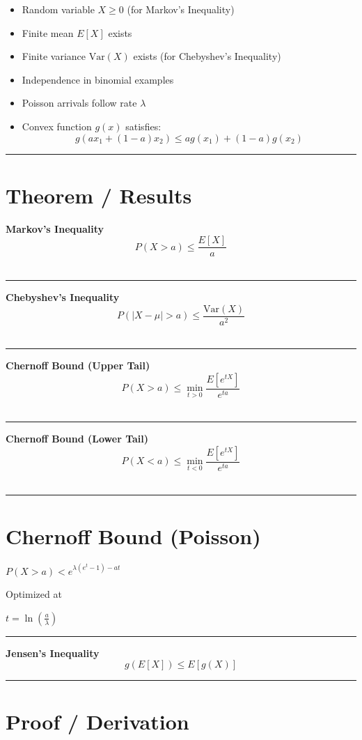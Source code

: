\documentclass[12pt]{article}
\begin{document}
\begin{itemize}
    \item Random variable $X \geq 0$ (for Markov’s Inequality)
    \item Finite mean $E[X]$ exists
    \item Finite variance $\mathrm{Var}(X)$ exists (for Chebyshev’s Inequality)
    \item Independence in binomial examples
    \item Poisson arrivals follow rate $\lambda$
    \item Convex function $g(x)$ satisfies:
    \[
    g(ax_1 + (1-a)x_2) \leq a g(x_1) + (1-a) g(x_2)
    \]
\end{itemize}
\noindent\rule{\textwidth}{0.4pt}
\section*{Theorem / Results}

\textbf{Markov’s Inequality}
\[
P(X > a) \leq \frac{E[X]}{a}
\]
\\
\noindent\rule{\textwidth}{0.4pt}
\textbf{Chebyshev’s Inequality}
\[
P(|X - \mu| > a) \leq \frac{\mathrm{Var}(X)}{a^2}
\]
\\
\noindent\rule{\textwidth}{0.4pt}
\textbf{Chernoff Bound (Upper Tail)}
\[
P(X > a) \leq \min_{t > 0} \frac{E[e^{tX}]}{e^{ta}}
\]
\\
\noindent\rule{\textwidth}{0.4pt}
\textbf{Chernoff Bound (Lower Tail)}
\[
P(X < a) \leq \min_{t < 0} \frac{E[e^{tX}]}{e^{ta}}
\]
\\
\noindent\rule{\textwidth}{0.4pt}
\section*{Chernoff Bound (Poisson)}

    \begin{center}
        $P(X > a) < e^{\lambda (e^t - 1) - at}$
    \end{center}

    \item Optimized at
    \begin{center}
        $t = \ln\left(\frac{a}{\lambda}\right)$
    \end{center}
\noindent\rule{\textwidth}{0.4pt}
\textbf{Jensen’s Inequality}
\[
g(E[X]) \leq E[g(X)]
\]
\noindent\rule{\textwidth}{0.4pt}
\section*{Proof / Derivation}
\end{document}

